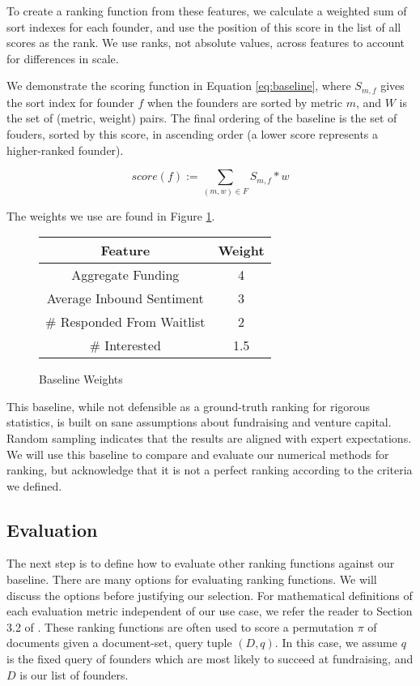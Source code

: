 To create a ranking function from these features, we calculate a weighted sum of sort indexes for each founder, and use the position of this score in the list of all scores as the rank. We use ranks, not absolute values, across features to account for differences in scale.

We demonstrate the scoring function in Equation \ref{eq:baseline}, where $S_{m, f}$ gives the sort index for founder $f$ when the founders are sorted by metric $m$, and $W$ is the set of (metric, weight) pairs. The final ordering of the baseline is the set of fouders, sorted by this score, in ascending order (a lower score represents a higher-ranked founder).

\begin{equation}
\label{eq:baseline}
  score(f) := \sum_{(m, w) \in F} S_{m, f} * w
\end{equation}

\noindent The weights we use are found in Figure \ref{fig:baseline:weights}.

\begin{figure}[ht]
\begin{tabular}{c | c}
\textbf{Feature}           & \textbf{Weight} \\\hline
Aggregate Funding          & 4 \\\hline
Average Inbound Sentiment  & 3 \\\hline
\# Responded From Waitlist & 2 \\\hline
\# Interested              & 1.5
\end{tabular}
\centering
\caption{Baseline Weights}
\label{fig:baseline:weights}
\end{figure}

This baseline, while not defensible as a ground-truth ranking for rigorous statistics, is built on sane assumptions about fundraising and venture capital. Random sampling indicates that the results are aligned with expert expectations. We will use this baseline to compare and evaluate our numerical methods for ranking, but acknowledge that it is not a perfect ranking according to the criteria we defined.

\subsection{Evaluation}

The next step is to define how to evaluate other ranking functions against our baseline. There are many options for evaluating ranking functions. We will discuss the options before justifying our selection. For mathematical definitions of each evaluation metric independent of our use case, we refer the reader to Section 3.2 of \cite{DBLP:journals/corr/abs-0704-3359}. These ranking functions are often used to score a permutation $\pi$ of documents given a document-set, query tuple $(D, q)$. In this case, we assume $q$ is the fixed query of founders which are most likely to succeed at fundraising, and $D$ is our list of founders.

